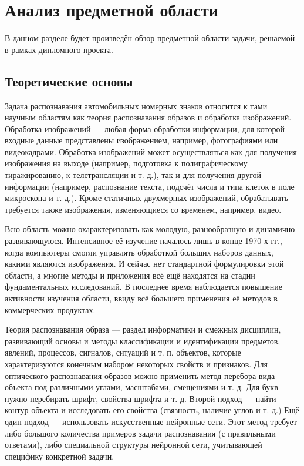 \section{Анализ предметной области}
\label{sec:domain}

В данном разделе будет произведён обзор предметной области задачи, решаемой в рамках дипломного проекта.

\subsection{Теоретические основы}
\label{sub:domain:theory_basics}
Задача распознавания автомобильных номерных знаков относится к тами научным областям как теория распознавания образов и обработка изображений.
Обработка изображений — любая форма обработки информации, для которой входные данные представлены изображением, например, фотографиями или видеокадрами. Обработка изображений может осуществляться как для получения изображения на выходе (например, подготовка к полиграфическому тиражированию, к телетрансляции и т. д.), так и для получения другой информации (например, распознание текста, подсчёт числа и типа клеток в поле микроскопа и т. д.). Кроме статичных двухмерных изображений, обрабатывать требуется также изображения, изменяющиеся со временем, например, видео.~\cite{image_precessing}

Всю область можно охарактеризовать как молодую, разнообразную и динамично развивающуюся. Интенсивное её изучение началось лишь в конце 1970-х гг., когда компьютеры смогли управлять обработкой больших наборов данных, какими являются изображения. И сейчас нет стандартной формулировки этой области, а многие методы и приложения всё ещё находятся на стадии фундаментальных исследований. В последнее время наблюдается повышение активности изучения области, ввиду всё большего применения её методов в коммерческих продуктах.

Теория распознавания образа — раздел информатики и смежных дисциплин, развивающий основы и методы классификации и идентификации предметов, явлений, процессов, сигналов, ситуаций и т. п. объектов, которые характеризуются конечным набором некоторых свойств и признаков.
Для оптического распознавания образов можно применить метод перебора вида объекта под различными углами, масштабами, смещениями и т. д. Для букв нужно перебирать шрифт, свойства шрифта и т. д.
Второй подход — найти контур объекта и исследовать его свойства (связность, наличие углов и т. д.)
Ещё один подход — использовать искусственные нейронные сети. Этот метод требует либо большого количества примеров задачи распознавания (с правильными ответами), либо специальной структуры нейронной сети, учитывающей специфику конкретной задачи.

